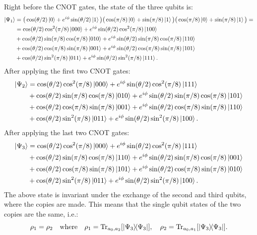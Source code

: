 Right before the CNOT gates, the state of the three qubits is:
\[
    \begin{split}
    \ket{\Psi_1}&=\big(\cos(\theta/2)\ket{0}+e^{i\phi}\sin(\theta/2)\ket{1}\big)\big(\cos(\pi/8)\ket{0}+\sin(\pi/8)\ket{1}\big)\big(\cos(\pi/8)\ket{0}+\sin(\pi/8)\ket{1}\big)=\\
    &=\cos(\theta/2)\cos^2(\pi/8)\ket{000}+e^{i\phi}\sin(\theta/2)\cos^2(\pi/8)\ket{100}\\
    &+\cos(\theta/2)\sin(\pi/8)\cos(\pi/8)\ket{010}+e^{i\phi}\sin(\theta/2)\sin(\pi/8)\cos(\pi/8)\ket{110}\\
    &+\cos(\theta/2)\cos(\pi/8)\sin(\pi/8)\ket{001}+e^{i\phi}\sin(\theta/2)\cos(\pi/8)\sin(\pi/8)\ket{101}\\
    &+\cos(\theta/2)\sin^2(\pi/8)\ket{011}+e^{i\phi}\sin(\theta/2)\sin^2(\pi/8)\ket{111}.
    \end{split}
\]
After applying the first two CNOT gates:
\[
    \begin{split}
    \ket{\Psi_2}&=\cos(\theta/2)\cos^2(\pi/8)\ket{000}+e^{i\phi}\sin(\theta/2)\cos^2(\pi/8)\ket{111}\\
    &+\cos(\theta/2)\sin(\pi/8)\cos(\pi/8)\ket{010}+e^{i\phi}\sin(\theta/2)\sin(\pi/8)\cos(\pi/8)\ket{101}\\
    &+\cos(\theta/2)\cos(\pi/8)\sin(\pi/8)\ket{001}+e^{i\phi}\sin(\theta/2)\cos(\pi/8)\sin(\pi/8)\ket{110}\\
    &+\cos(\theta/2)\sin^2(\pi/8)\ket{011}+e^{i\phi}\sin(\theta/2)\sin^2(\pi/8)\ket{100}.
    \end{split}
\]
After applying the last two CNOT gates:
\[
    \begin{split}
    \ket{\Psi_3}&=\cos(\theta/2)\cos^2(\pi/8)\ket{000}+e^{i\phi}\sin(\theta/2)\cos^2(\pi/8)\ket{111}\\
    &+\cos(\theta/2)\sin(\pi/8)\cos(\pi/8)\ket{110}+e^{i\phi}\sin(\theta/2)\sin(\pi/8)\cos(\pi/8)\ket{001}\\
    &+\cos(\theta/2)\cos(\pi/8)\sin(\pi/8)\ket{101}+e^{i\phi}\sin(\theta/2)\cos(\pi/8)\sin(\pi/8)\ket{010}\\
    &+\cos(\theta/2)\sin^2(\pi/8)\ket{011}+e^{i\phi}\sin(\theta/2)\sin^2(\pi/8)\ket{100}.
    \end{split}
\]
The above state is invariant under the exchange of the second and third qubits, where the copies are made. 
This means that the single qubit states of the two copies are the same, i.e.:
\[
    \rho_{1}=\rho_{2} \quad \text{where} \quad \rho_{1}=\Tr_{a_0,a_2}[\ketbra{\Psi_3}], \quad \rho_{2}=\Tr_{a_0,a_1}[\ketbra{\Psi_3}].
\]
